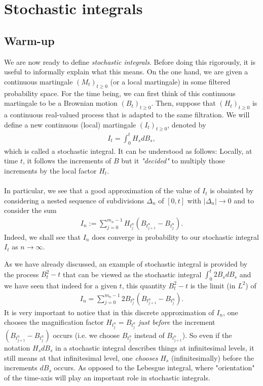 \documentclass[../mainfile.tex]{subfiles}
\begin{document}
\section{Stochastic integrals}
\subsection{Warm-up}
We are now ready to define \textit{stochastic integrals}. Before doing this rigorously, it is useful to informally explain what this means. On the one hand, we are given a continuous martingale $(M_t)_{t \geq 0}$ (or a local martingale) in some filtered probability space. For the time being, we can first think of this continuous martingale to be a Brownian motion $(B_t)_{t \geq 0}$. Then, suppose that $(H_t)_{t \geq 0}$ is a continuous real-valued process that is adapted to the same filtration. We will define a new continuous (local) martingale $(I_t)_{t \geq 0}$, denoted by 
\begin{align*}
I_t= \int_0^t H_sdB_s, \tag{Notation}
\end{align*}
which is called a stochastic integral. It can be understood as follows: Locally, at time $t$, it follows the increments of $B$ but it \textit{"decided"} to multiply those increments by the local factor $H_t$. \\
\\
In particular, we see that a good approximation of the value of $I_t$ is obainted by considering a nested sequence of subdivisions $\Delta_n$ of $[0,t]$ with $|\Delta_n| \to 0$ and to consider the sum 
\begin{align*}
I_n:= \sum_{j=0}^{m_n-1} H_{t_j^n} (B_{t_{j+1}^n}-B_{t_j^n}). 
\end{align*}
Indeed, we shall see that $I_n$ does converge in probability to our stochastic integral $I_t$ as $n \to \infty$.
\begin{rem} As we have already discussed,  an example of stochastic integral is provided by the process $B_t^2-t$ that can be viewed as the stochastic integral $\int_0^t 2B_s dB_s$ and we have seen that indeed for a given $t$, this quantity $B_t^2-t$ is the limit (in $L^2$) of 
\begin{align*}
I_n = \sum_{j=0}^{m_n-1} 2B_{t_j^n} (B_{t_{j+1}^n}-B_{t_j^n}). 
\end{align*}
It is very important to notice that in this discrete approximation of $I_n$, one chooses the  magnification factor $H_{t_j^n}=B_{t_j^n}$ \textit{just before} the increment $(B_{t_{j+1}^n}-B_{t_j^n})$ occurs (i.e. we choose $B_{t_j^n}$ instead of $B_{t_{j+1}^n}$). So even if the notation $H_sdB_s$ in a stochastic integral describes things at infinitesimal levels, it still means at that infinitesimal level, one \textit{chooses} $H_s$ (infinitesimally) before the increments $dB_s$ occurs. As opposed to the Lebesgue integral, where "orientation" of the time-axis will play an important role in stochastic integrals. 
\end{rem}
\end{document}
